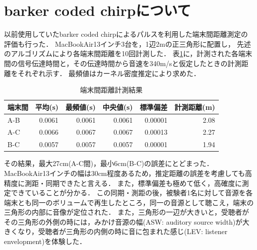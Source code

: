 

\section{barker coded chirpについて}
以前使用していたbarker coded chirpによるパルスを利用した端末間距離測定の評価も行った．
MacBookAir13インチ3台を，1辺2mの正三角形に配置し，
先述のアルゴリズムにより各端末間距離を10回計測した．
表\ref{tab:estdistance}に，計測された各端末間の信号伝達時間と，その伝達時間から音速を340m/sと仮定したときの計測距離をそれぞれ示す．
最頻値はカーネル密度推定により求めた．

\begin{table}[p]\centering
  \caption{端末間距離計測結果}
  \label{tab:estdistance}
  \begin{tabular}{l|rrrrr}
    \hline
    端末間&平均(s)&最頻値(s)&中央値(s)&標準偏差&計測距離(m)\\
    \hline
    A-B&0.0061&0.0061&0.0061&0.00001&2.08\\
    A-C&0.0066&0.0067&0.0067&0.00013&2.27\\
    B-C&0.0057&0.0057&0.0057&0.00001&1.94\\
    \hline
  \end{tabular}
\end{table}


その結果，最大27cm(A-C間)，最小6cm(B-C)の誤差にとどまった．
MacBookAir13インチの幅は30cm程度あるため，推定距離の誤差を考慮しても高精度に測距・同期できたと言える．
また，標準偏差も極めて低く，高確度に測定できていることが分かる．
この同期・測距の後，被験者1名に対して音源を各端末とも同一のボリュームで再生したところ，同一の音源として聴こえ，端末の三角形の内部に音像が定位された．
また，三角形の一辺が大きいと，受聴者がその三角形の外側の時には，みかけ音源の幅(ASW: auditory source width)が大きくなり，受聴者が三角形の内側の時に音に包まれた感じ(LEV: listener envelopment)を体験した．
